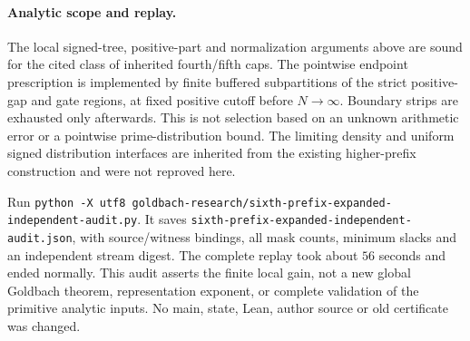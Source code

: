 \paragraph{Analytic scope and replay.}
The local signed-tree, positive-part and normalization arguments above
are sound for the cited class of inherited fourth/fifth caps. The
pointwise endpoint prescription is implemented by finite buffered
subpartitions of the strict positive-gap and gate regions, at fixed
positive cutoff before $N\to\infty$. Boundary strips are exhausted
only afterwards. This is not selection based on an unknown arithmetic
error or a pointwise prime-distribution bound. The limiting density
and uniform signed distribution interfaces are inherited from the
existing higher-prefix construction and were not reproved here.

Run \texttt{python -X utf8 goldbach-research/sixth-prefix-expanded-independent-audit.py}.
It saves \texttt{sixth-prefix-expanded-independent-audit.json}, with
source/witness bindings, all mask counts, minimum slacks and an
independent stream digest. The complete replay took about $56$
seconds and ended normally. This audit asserts the finite local gain,
not a new global Goldbach theorem, representation exponent, or complete
validation of the primitive analytic inputs. No main, state, Lean,
author source or old certificate was changed.
